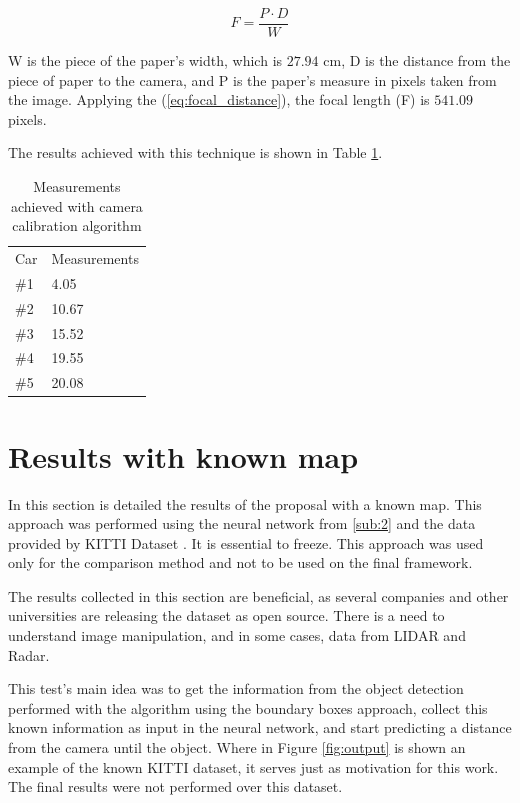 \begin{equation}
    \label{eq:focal_distance}
    F = \frac{P\cdot D}{W}
\end{equation}

W is the piece of the paper's width, which is $27.94$ cm, D is the distance from the piece of paper to the camera, and P is the paper's measure in pixels taken from the image. Applying the (\ref{eq:focal_distance}), the focal length (F) is $541.09$ pixels.





The results achieved with this technique is shown in Table \ref{tab:output_calibrate}. 

\begin{table}[H]
\centering
\caption{Measurements achieved with camera calibration algorithm}
\begin{tabular}{l|l} 
\toprule
Car &  Measurements      \\
\#1   & 4.05        \\
\#2   & 10.67       \\
\#3   & 15.52       \\
\#4   & 19.55       \\
\#5   & 20.08       \\
\bottomrule
\end{tabular}
\label{tab:output_calibrate}
\end{table} 



\section{Results with known map}
In this section is detailed the results of the proposal with a known map. This approach was performed using the neural network from \ref{sub:2} and the data provided by KITTI Dataset \cite{geiger2013vision}. It is essential to freeze. This approach was used only for the comparison method and not to be used on the final framework. 


The results collected in this section are beneficial, as several companies and other universities are releasing the dataset as open source. There is a need to understand image manipulation, and in some cases, data from LIDAR and Radar.

This test's main idea was to get the information from the object detection performed with the algorithm using the boundary boxes approach, collect this known information as input in the neural network, and start predicting a distance from the camera until the object. Where in Figure \ref{fig:output} is shown an example of the known KITTI dataset, it serves just as motivation for this work. The final results were not performed over this dataset. 

